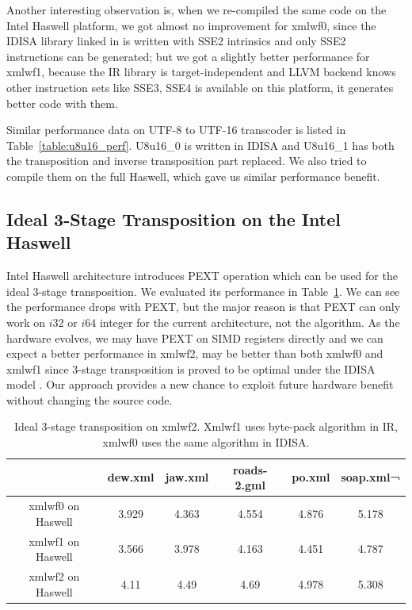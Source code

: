 Another interesting observation is, when we re-compiled the same code on the Intel Haswell platform, we got almost no improvement for xmlwf0, since the IDISA library linked in is written with SSE2 intrinsics and only SSE2 instructions can be generated; but we got a slightly better performance for xmlwf1, because the IR library is target-independent and LLVM backend knows other instruction sets like SSE3, SSE4 is available on this platform, it generates better code with them.

Similar performance data on UTF-8 to UTF-16 transcoder is listed in Table~\ref{table:u8u16_perf}. U8u16\_0 is written in IDISA and U8u16\_1 has both the transposition and inverse transposition part replaced. We also tried to compile them on the full Haswell, which gave us similar performance benefit.

\subsection{Ideal 3-Stage Transposition on the Intel Haswell}
Intel Haswell architecture introduces PEXT operation which can be used for the ideal 3-stage transposition. We evaluated its performance in Table~\ref{table:PEXT_transposition}. We can see the performance drops with PEXT, but the major reason is that PEXT can only work on $i32$ or $i64$ integer for the current architecture, not the algorithm. As the hardware evolves, we may have PEXT on SIMD registers directly and we can expect a better performance in xmlwf2, may be better than both xmlwf0 and xmlwf1 since 3-stage transposition is proved to be optimal under the IDISA model \cite{inductive_doubling_principle}. Our approach provides a new chance to exploit future hardware benefit without changing the source code.

\begin{table}[h]
\centering
\begin{tabular}{|c|c|c|c|c|c|}
\hline
        & dew.xml  &  jaw.xml  &  roads-2.gml  &  po.xml  & soap.xml¬ \\\hline
xmlwf0 on Haswell   &  3.929   &   4.363   &   4.554   &   4.876   &   5.178 \\ \hline
xmlwf1 on Haswell &   3.566   &   3.978   &   4.163   &   4.451   &   4.787 \\ \hline
xmlwf2 on Haswell & 4.11   &    4.49   &    4.69   &    4.978   &   5.308 \\ \hline
\end{tabular}
\caption[Ideal 3-Stage Transposition with PEXT]{Ideal 3-stage transposition on xmlwf2. Xmlwf1 uses byte-pack algorithm in IR, xmlwf0 uses the same algorithm in IDISA.}
\label{table:PEXT_transposition}
\end{table}

